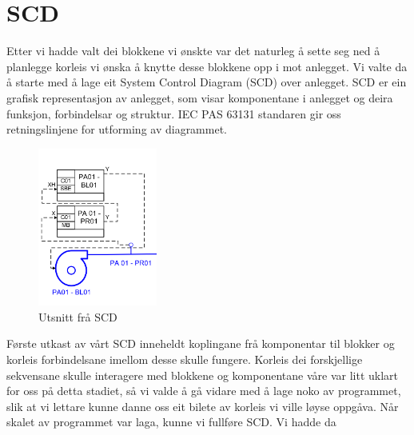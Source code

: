 \section{SCD}
\thispagestyle{fancy}

Etter vi hadde valt dei blokkene vi ønskte var det naturleg å sette seg ned å planlegge korleis vi ønska å knytte desse blokkene opp i mot anlegget. 
Vi valte da å starte med å lage eit System Control Diagram (SCD) over anlegget. 
SCD er ein grafisk representasjon av anlegget, som visar komponentane i anlegget og deira funksjon, forbindelsar og struktur. 
IEC PAS 63131 standaren gir oss retningslinjene for utforming av diagrammet.


\begin{figure}[htbp]
    \centering
    \includegraphics[width=0.35\textwidth]{Bilder/Visio_eksempel.png}
    \caption{Utsnitt frå SCD}\label{fig:SCD eksempel}    
\end{figure}


Første utkast av vårt SCD inneheldt koplingane frå komponentar til blokker og korleis forbindelsane imellom desse skulle fungere. 
Korleis dei forskjellige sekvensane skulle interagere med blokkene og komponentane våre var litt uklart for oss på detta stadiet,
så vi valde å gå vidare med å lage noko av programmet, slik at vi lettare kunne danne oss eit bilete av korleis vi ville løyse oppgåva.
Når skalet av programmet var laga, kunne vi fullføre SCD. Vi hadde da 



\newpage